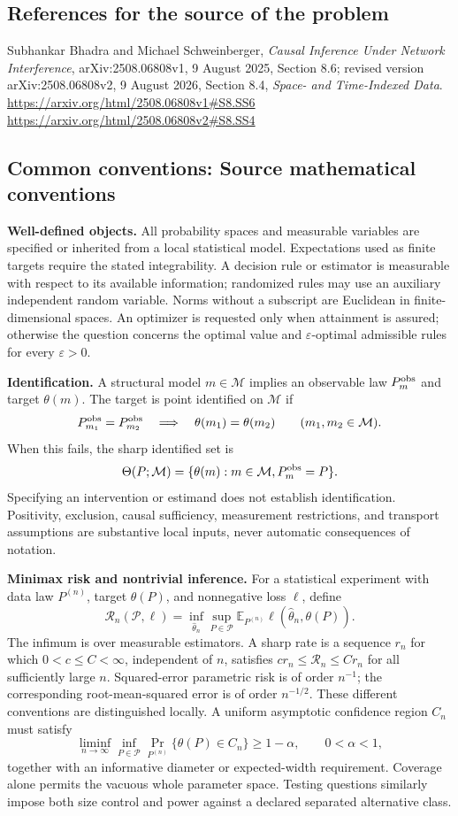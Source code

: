 \documentclass[11pt,a4paper]{article}
\newcommand{\E}{\mathbb E}
\begin{document}
\subsection*{References for the source of the problem}
Subhankar Bhadra and Michael Schweinberger, \emph{Causal Inference Under Network Interference}, arXiv:2508.06808v1, 9 August 2025, Section 8.6; revised version arXiv:2508.06808v2, 9 August 2026, Section 8.4, \emph{Space- and Time-Indexed Data}.
\url{https://arxiv.org/html/2508.06808v1#S8.SS6}
\url{https://arxiv.org/html/2508.06808v2#S8.SS4}

\subsection*{Common conventions: Source mathematical conventions}

\textbf{Well-defined objects.}
All probability spaces and measurable variables are specified or inherited
from a local statistical model. Expectations used as finite targets require
the stated integrability. A decision rule or estimator is measurable with
respect to its available information; randomized rules may use an auxiliary
independent random variable. Norms without a subscript are Euclidean in
finite-dimensional spaces. An optimizer is requested only when attainment
is assured; otherwise the question concerns the optimal value and
$\varepsilon$-optimal admissible rules for every $\varepsilon>0$.

\textbf{Identification.}
A structural model $m\in\mathcal M$ implies an observable law
$P_m^{\rm obs}$ and target $\theta(m)$. The target is point identified on
$\mathcal M$ if
\[
 P_{m_1}^{\rm obs}=P_{m_2}^{\rm obs}
 \quad\Longrightarrow\quad\theta(m_1)=\theta(m_2)
 \qquad(m_1,m_2\in\mathcal M).
\]
When this fails, the sharp identified set is
\[
 \Theta(P;\mathcal M)=\{\theta(m):m\in\mathcal M,
                                  P_m^{\rm obs}=P\}.
\]
Specifying an intervention or estimand does not establish identification.
Positivity, exclusion, causal sufficiency, measurement restrictions, and
transport assumptions are substantive local inputs, never automatic
consequences of notation.

\textbf{Minimax risk and nontrivial inference.}
For a statistical experiment with data law $P^{(n)}$, target $\theta(P)$,
and nonnegative loss $\ell$, define
\[
 \mathcal R_n(\mathcal P,\ell)
   =\inf_{\widehat\theta_n}\sup_{P\in\mathcal P}
      \E_{P^{(n)}}\ell(\widehat\theta_n,\theta(P)).
\]
The infimum is over measurable estimators. A sharp rate is a sequence
$r_n$ for which $0<c\leq C<\infty$, independent of $n$, satisfies
$c r_n\leq\mathcal R_n\leq C r_n$ for all sufficiently large $n$.
Squared-error parametric risk is of order $n^{-1}$; the corresponding
root-mean-squared error is of order $n^{-1/2}$. These different conventions
are distinguished locally. A uniform asymptotic confidence region $C_n$
must satisfy
\[
 \liminf_{n\to\infty}\inf_{P\in\mathcal P}
     \Pr_{P^{(n)}}\{\theta(P)\in C_n\}\geq 1-\alpha,
 \qquad 0<\alpha<1,
\]
together with an informative diameter or expected-width requirement.
Coverage alone permits the vacuous whole parameter space. Testing questions
similarly impose both size control and power against a declared separated
alternative class.
\end{document}
